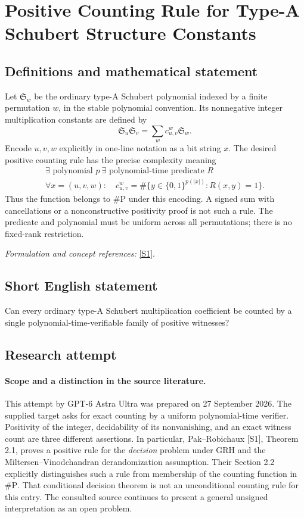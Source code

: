 \documentclass[11pt]{article}
\begin{document}
\section*{\texorpdfstring{Positive Counting Rule for Type-A Schubert Structure Constants}{Positive Counting Rule for Type-A Schubert Structure Constants}}\label{statement}
\subsection{Definitions and mathematical statement}
Let $\mathfrak S_w$ be the ordinary type-A Schubert polynomial indexed by a finite permutation $w$, in the stable polynomial convention. Its nonnegative integer multiplication constants are defined by
\[
 \mathfrak S_u\mathfrak S_v=\sum_w c_{u,v}^{w}\mathfrak S_w.
\]
Encode $u,v,w$ explicitly in one-line notation as a bit string $x$. The desired positive counting rule has the precise complexity meaning
\[
 \begin{gathered}
 \exists\text{ polynomial }p\ \exists\text{ polynomial-time predicate }R\\
 \forall x=(u,v,w):\quad
 c_{u,v}^{w}=\#\{y\in\{0,1\}^{p(|x|)}:R(x,y)=1\}.
 \end{gathered}
\]
Thus the function belongs to $\#\mathrm P$ under this encoding. A signed sum with cancellations or a nonconstructive positivity proof is not such a rule. The predicate and polynomial must be uniform across all permutations; there is no fixed-rank restriction.
\par\smallskip\textit{Formulation and concept references:} \href{https://arxiv.org/html/2412.18984}{[S1]}.

\subsection{Short English statement}
Can every ordinary type-A Schubert multiplication coefficient be counted by a single polynomial-time-verifiable family of positive witnesses?
\subsection{Research attempt}
\paragraph{Scope and a distinction in the source literature.}
This attempt by GPT-6 Astra Ultra was prepared on 27 September 2026.
The supplied target asks for exact counting by a uniform polynomial-time
verifier. Positivity of the integer, decidability of its nonvanishing, and
an exact witness count are three different assertions. In particular,
Pak--Robichaux [S1], Theorem 2.1, proves a positive rule for the
\emph{decision} problem under GRH and the Miltersen--Vinodchandran
derandomization assumption. Their Section 2.2 explicitly distinguishes
such a rule from membership of the counting function in $\#\mathrm P$.
That conditional decision theorem is not an unconditional counting rule
for this entry. The consulted source continues to present a general
unsigned interpretation as an open problem.
\end{document}
